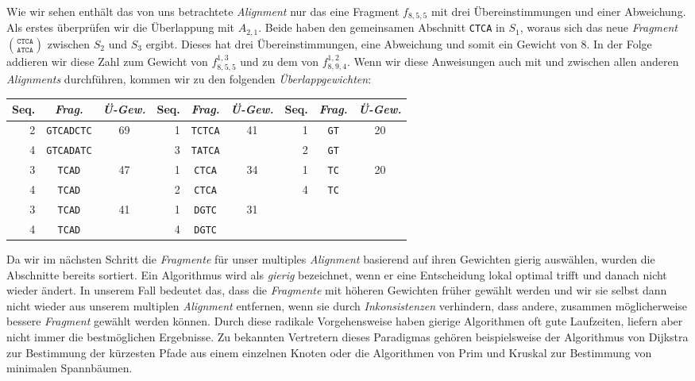 Wie wir sehen enthält das von uns betrachtete \emph{Alignment} nur das eine Fragment $f_{8,5,5}$ mit drei Übereinstimmungen und einer Abweichung. Als erstes überprüfen wir die Überlappung mit $A_{2,1}$. Beide haben den gemeinsamen Abschnitt \texttt{CTCA} in $S_1$, woraus sich das neue \emph{Fragment} ${\texttt{CTCA}}\choose{\texttt{ATCA}}$ zwischen $S_2$ und $S_3$ ergibt. Dieses hat drei Übereinstimmungen, eine Abweichung und somit ein Gewicht von 8. In der Folge addieren wir diese Zahl zum Gewicht von $f_{8,5,5}^{1,3}$ und zu dem von $f_{8,9,4}^{1,2}$. Wenn wir diese Anweisungen auch mit und zwischen allen anderen \emph{Alignments} durchführen, kommen wir zu den folgenden \emph{Überlappgewichten}:

\begin{tabular}{r|c|c||r|c|c||r|c|c}
	Seq. & \emph{Frag.} & \emph{Ü-Gew.} & Seq. & \emph{Frag.} & \emph{Ü-Gew.} & Seq. & \emph{Frag.} & \emph{Ü-Gew.}\\
	\hline
	2 & \texttt{GTCADCTC} & \multirow{2}{*}{69} & 1 & \texttt{TCTCA} & \multirow{2}{*}{41} & 1 & \texttt{GT} &\multirow{2}{*}{20} \\
	4 & \texttt{GTCADATC} &                     & 3 & \texttt{TATCA} &                     & 2 & \texttt{GT} & \\
	3 & \texttt{TCAD} & \multirow{2}{*}{47} & 1 & \texttt{CTCA} & \multirow{2}{*}{34} & 1 & \texttt{TC} & \multirow{2}{*}{20} \\
	4 & \texttt{TCAD} &                     & 2 & \texttt{CTCA} &                          & 4 & \texttt{TC} & \\
	3 & \texttt{TCAD} & \multirow{2}{*}{41} & 1 & \texttt{DGTC} & \multirow{2}{*}{31} &    &   & \\
    4 & \texttt{TCAD} &                     & 4 & \texttt{DGTC} &                     &    &   & \\
\end{tabular}

Da wir im nächsten Schritt die \emph{Fragmente} für unser multiples \emph{Alignment} basierend auf ihren Gewichten gierig auswählen, wurden die Abschnitte bereits sortiert. Ein Algorithmus wird als \emph{gierig} bezeichnet, wenn er eine Entscheidung lokal optimal trifft und danach nicht wieder ändert. In unserem Fall bedeutet das, dass die \emph{Fragmente} mit höheren Gewichten früher gewählt werden und wir sie selbst dann nicht wieder aus unserem multiplen \emph{Alignment} entfernen, wenn sie durch \emph{Inkonsistenzen} verhindern, dass andere, zusammen möglicherweise bessere \emph{Fragment} gewählt werden können. Durch diese radikale Vorgehensweise haben gierige Algorithmen oft gute Laufzeiten, liefern aber nicht immer die bestmöglichen Ergebnisse. Zu bekannten Vertretern dieses Paradigmas gehören beispielsweise der Algorithmus von Dijkstra zur Bestimmung der kürzesten Pfade aus einem einzelnen Knoten oder die Algorithmen von Prim und Kruskal zur Bestimmung von minimalen Spannbäumen.

